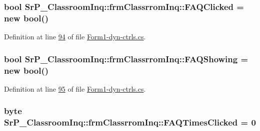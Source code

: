 \hypertarget{class_sr_p___classroom_inq_1_1frm_classrrom_inq_a2b3fd84c890215dd61c54946b49906d2}{
\subsubsection[{\-F\-A\-Q\-Clicked}]{\setlength{\rightskip}{0pt plus 5cm}bool {\bf \-Sr\-P\-\_\-\-Classroom\-Inq\-::frm\-Classrrom\-Inq\-::\-F\-A\-Q\-Clicked} = new bool()}}
\label{class_sr_p___classroom_inq_1_1frm_classrrom_inq_a2b3fd84c890215dd61c54946b49906d2}


\-Definition at line \hyperlink{_form1-dyn-ctrls_8cs_source_l00094}{94} of file \hyperlink{_form1-dyn-ctrls_8cs_source}{\-Form1-\/dyn-\/ctrls.\-cs}.

\hypertarget{class_sr_p___classroom_inq_1_1frm_classrrom_inq_a37a892198dda5bfa752c66df2debb199}{
\subsubsection[{\-F\-A\-Q\-Showing}]{\setlength{\rightskip}{0pt plus 5cm}bool {\bf \-Sr\-P\-\_\-\-Classroom\-Inq\-::frm\-Classrrom\-Inq\-::\-F\-A\-Q\-Showing} = new bool()}}
\label{class_sr_p___classroom_inq_1_1frm_classrrom_inq_a37a892198dda5bfa752c66df2debb199}


\-Definition at line \hyperlink{_form1-dyn-ctrls_8cs_source_l00095}{95} of file \hyperlink{_form1-dyn-ctrls_8cs_source}{\-Form1-\/dyn-\/ctrls.\-cs}.

\hypertarget{class_sr_p___classroom_inq_1_1frm_classrrom_inq_a81d1b27ebc720a6da339e1816eab4dfa}{
\subsubsection[{\-F\-A\-Q\-Times\-Clicked}]{\setlength{\rightskip}{0pt plus 5cm}byte {\bf \-Sr\-P\-\_\-\-Classroom\-Inq\-::frm\-Classrrom\-Inq\-::\-F\-A\-Q\-Times\-Clicked} = 0}}
\label{class_sr_p___classroom_inq_1_1frm_classrrom_inq_a81d1b27ebc720a6da339e1816eab4dfa}


